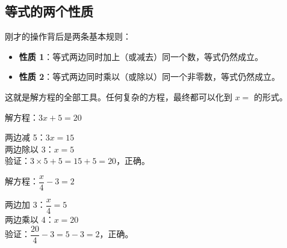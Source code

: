 \subsection*{等式的两个性质}

刚才的操作背后是两条基本规则：

\begin{itemize}
  \item \textbf{性质 1}：等式两边同时加上（或减去）同一个数，等式仍然成立。
  \item \textbf{性质 2}：等式两边同时乘以（或除以）同一个非零数，等式仍然成立。
\end{itemize}

这就是解方程的全部工具。任何复杂的方程，最终都可以化到 $x=$ 的形式。

\begin{example}
解方程：$3x+5=20$
\end{example}
\begin{solution}
两边减 5：$3x = 15$\\
两边除以 3：$x = 5$\\
验证：$3\times5+5=15+5=20$，正确。
\end{solution}

\begin{example}
解方程：$\dfrac{x}{4}-3=2$
\end{example}
\begin{solution}
两边加 3：$\dfrac{x}{4} = 5$\\
两边乘以 4：$x = 20$\\
验证：$\dfrac{20}{4}-3=5-3=2$，正确。
\end{solution}

